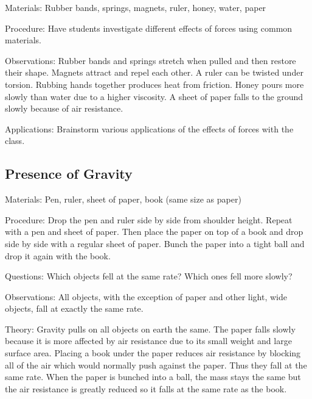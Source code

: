 \begin{multicols}{2}
\begin{description*}
\item[Materials:]{Rubber bands, springs, magnets, ruler, honey, water, paper}
\item[Procedure:]{Have students investigate different effects of forces using common materials.}
\item[Observations:]{Rubber bands and springs stretch when pulled and then restore their shape. Magnets attract and repel each other. A ruler can be twisted under torsion. Rubbing hands together produces heat from friction. Honey pours more slowly than water due to a higher viscosity. A sheet of paper falls to the ground slowly because of air resistance.}
\item[Applications:]{Brainstorm various applications of the effects of forces with the class.}
\end{description*}

\subsection{Presence of Gravity} 
\begin{description*}
\item[Materials:]{Pen, ruler, sheet of paper, book (same size as paper)}
\item[Procedure:]{Drop the pen and ruler side by side from shoulder height. Repeat with a pen and sheet of paper. Then place the paper on top of a book and drop side by side with a regular sheet of paper. Bunch the paper into a tight ball and drop it again with the book.}
\item[Questions:]{Which objects fell at the same rate? Which ones fell more slowly?}
\item[Observations:]{All objects, with the exception of paper and other light, wide objects, fall at exactly the same rate.}
\item[Theory:]{Gravity pulls on all objects on earth the same.  The paper falls slowly because it is more affected by air resistance due to its small weight and large surface area. Placing a book under the paper reduces air resistance by blocking all of the air which would normally push against the paper. Thus they fall at the same rate.  When the paper is bunched into a ball, the mass stays the same but the air resistance is greatly reduced so it falls at the same rate as the book.}
\end{description*}


\end{multicols}
